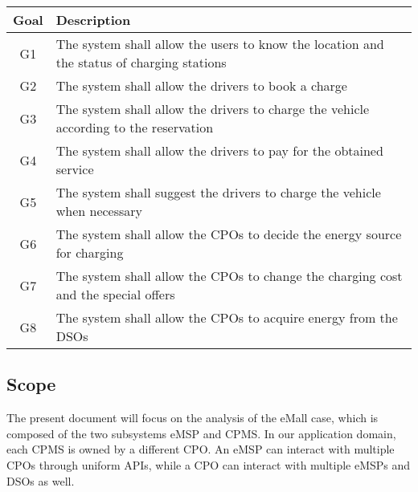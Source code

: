 \documentclass[../main.tex]{subfiles}
\begin{document}
\begin{center}
\begin{longtable}[\textwidth]{| c | p{12cm} | } 
\hline
\textbf{Goal} & \textbf{Description} \\
\hline
G1 & The system shall allow the users to know the location and the status of charging stations \\ 
\hline
G2 & The system shall allow the drivers to book a charge \\
\hline
G3 & The system shall allow the drivers to charge the vehicle according to the reservation \\
\hline
G4 & The system shall allow the drivers to pay for the obtained service \\
\hline
G5 & The system shall suggest the drivers to charge the vehicle when necessary \\
\hline
G6 & The system shall allow the CPOs to decide the energy source for charging \\
\hline
G7 & The system shall allow the CPOs to change the charging cost and the special offers \\
\hline
G8 & The system shall allow the CPOs to acquire energy from the DSOs \\
\hline
\end{longtable}
\end{center}



\subsection{Scope}
The present document will focus on the analysis of the eMall case, which is composed of the two subsystems eMSP and CPMS. In our application domain, each CPMS is owned by a different CPO. An eMSP can interact with multiple CPOs through uniform APIs, while a CPO can interact with multiple eMSPs and DSOs as well. 
\end{document}
